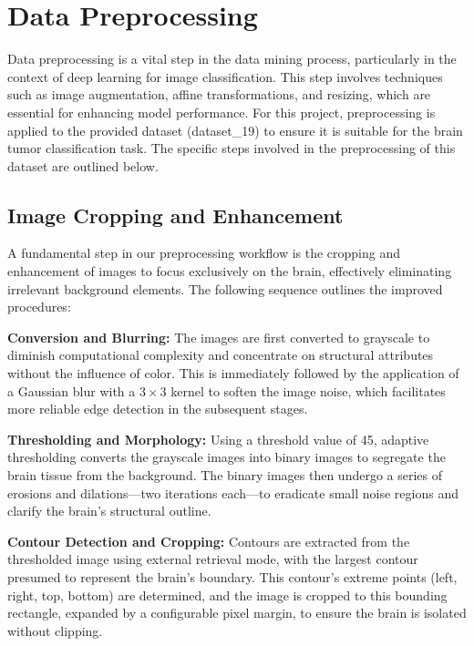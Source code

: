 \section{Data Preprocessing}\label{data_preprocessing}

Data preprocessing is a vital step in the data mining process, particularly in the context of deep learning for image classification. This step involves techniques such as image augmentation, affine transformations, and resizing, which are essential for enhancing model performance. For this project, preprocessing is applied to the provided dataset (dataset\_19) to ensure it is suitable for the brain tumor classification task. The specific steps involved in the preprocessing of this dataset are outlined below.

\subsection{Image Cropping and Enhancement}\label{image_cropping_enhancement}

A fundamental step in our preprocessing workflow is the cropping and enhancement of images to focus exclusively on the brain, effectively eliminating irrelevant background elements. The following sequence outlines the improved procedures:

\textbf{Conversion and Blurring:} The images are first converted to grayscale to diminish computational complexity and concentrate on structural attributes without the influence of color. This is immediately followed by the application of a Gaussian blur with a $3 \times 3$
 kernel to soften the image noise, which facilitates more reliable edge detection in the subsequent stages.

\textbf{Thresholding and Morphology:} Using a threshold value of 45, adaptive thresholding converts the grayscale images into binary images to segregate the brain tissue from the background. The binary images then undergo a series of erosions and dilations—two iterations each—to eradicate small noise regions and clarify the brain's structural outline.

\textbf{Contour Detection and Cropping:} Contours are extracted from the thresholded image using external retrieval mode, with the largest contour presumed to represent the brain's boundary. This contour's extreme points (left, right, top, bottom) are determined, and the image is cropped to this bounding rectangle, expanded by a configurable pixel margin, to ensure the brain is isolated without clipping.

